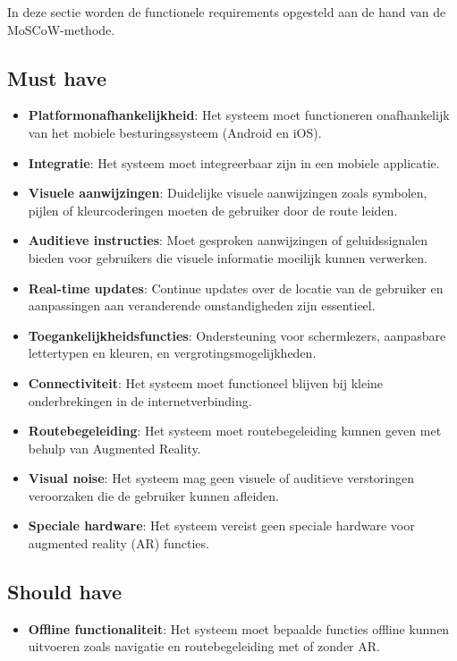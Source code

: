 In deze sectie worden de functionele requirements opgesteld aan de hand van de MoSCoW-methode.

\subsection*{Must have}
\begin{itemize}
    \item \textbf{Platformonafhankelijkheid}: Het systeem moet functioneren onafhankelijk van het mobiele besturingssysteem (Android en iOS).
    \item \textbf{Integratie}: Het systeem moet integreerbaar zijn in een mobiele applicatie.
    \item \textbf{Visuele aanwijzingen}: Duidelijke visuele aanwijzingen zoals symbolen, pijlen of kleurcoderingen moeten de gebruiker door de route leiden.
    \item \textbf{Auditieve instructies}: Moet gesproken aanwijzingen of geluidssignalen bieden voor gebruikers die visuele informatie moeilijk kunnen verwerken.
    \item \textbf{Real-time updates}: Continue updates over de locatie van de gebruiker en aanpassingen aan veranderende omstandigheden zijn essentieel.
    \item \textbf{Toegankelijkheidsfuncties}: Ondersteuning voor schermlezers, aanpasbare lettertypen en kleuren, en vergrotingsmogelijkheden.
    \item \textbf{Connectiviteit}: Het systeem moet functioneel blijven bij kleine onderbrekingen in de internetverbinding.
    \item \textbf{Routebegeleiding}: Het systeem moet routebegeleiding kunnen geven met behulp van Augmented Reality.
    \item \textbf{Visual noise}: Het systeem mag geen visuele of auditieve verstoringen veroorzaken die de gebruiker kunnen afleiden.
    \item \textbf{Speciale hardware}: Het systeem vereist geen speciale hardware voor augmented reality (AR) functies.
\end{itemize}

\subsection*{Should have}
\begin{itemize}
    \item \textbf{Offline functionaliteit}: Het systeem moet bepaalde functies offline kunnen uitvoeren zoals navigatie en routebegeleiding met of zonder AR.
\end{itemize}

